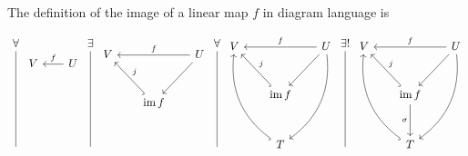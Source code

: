 \documentclass[12pt]{amsart}
\theoremstyle{definition}
\DeclareMathOperator{\image}{\mathrm{im}}
\begin{document}
\begin{enumerate}[start=0]
The definition of the image of a linear map $f$ in diagram language is

\[
    \begin{tikzcd}[row sep=1cm, column sep=.7cm]
     \forall\arrow[ddd, dash]\\
     \\
     \\
     \;
    \end{tikzcd} 
    \begin{tikzcd}[row sep=1cm, column sep=.65cm]
     V& U\arrow[l,"f"']\\
     &\\
     &
    \end{tikzcd}
    \begin{tikzcd}[row sep=1cm, column sep=.7cm]
     \exists\arrow[ddd, dash]\\
     \\
     \\
     \;
    \end{tikzcd} 
    \begin{tikzcd}[row sep=1cm, column sep=.65cm]
     V&& U\arrow[ll,"f"']\\
     &\image f\arrow[ul, hook, "j"']\arrow[ur, leftarrow]&\\ %
     & & 
    \end{tikzcd}
    \begin{tikzcd}[row sep=1cm, column sep=.7cm]
     \forall\arrow[ddd, dash,]\\
     \\
     \\
     \;
    \end{tikzcd}
    \begin{tikzcd}[row sep=1cm, column sep=.65cm]
     V&& U\arrow[ll,"f"']\\
     &\image f\arrow[ul, hook, "j"']\arrow[ur, leftarrow]&\\ %
     &T\arrow[uul, hook, bend left]\arrow[uur, leftarrow, bend right]& %
    \end{tikzcd}
    \begin{tikzcd}[row sep=1cm, column sep=.7cm]
     \exists!\arrow[ddd, dash]\\
     \\
     \\
     \;
    \end{tikzcd}
    \begin{tikzcd}[row sep=1cm, column sep=.65cm]
     V&& U\arrow[ll,"f"']\\
     &\image f\arrow[ul, hook, "j"']\arrow[ur, leftarrow]&\\ %
     &T\arrow[uul, hook, bend left]\arrow[uur, leftarrow, bend right]\arrow[u, leftarrow, "\sigma"]& 
    \end{tikzcd}
    \]


\end{enumerate}
\end{document}
